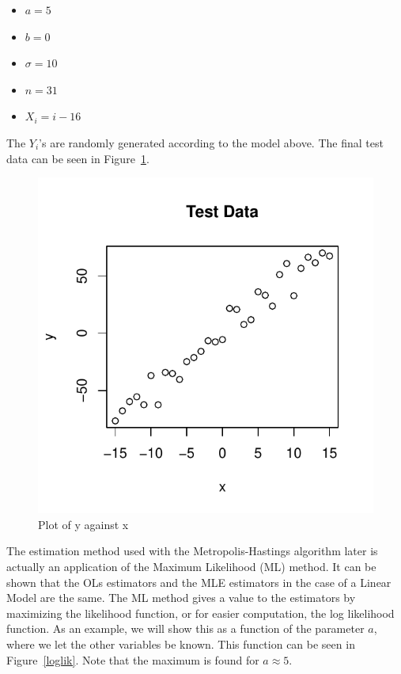 \documentclass[a4paper,10pt]{article}\usepackage[]{graphicx}\usepackage[]{color}
\makeatletter
\def\maxwidth{ %
  \ifdim\Gin@nat@width>\linewidth
    \linewidth
  \else
    \Gin@nat@width
  \fi
}
\newenvironment{knitrout}{}{} %
\makeatother
\begin{document}
\begin{itemize}
  \item $a = 5$
  \item $b = 0$
  \item $\sigma = 10$
  \item $n = 31$
  \item $X_i = i-16$
\end{itemize}
The $Y_i$'s are randomly generated according to the model above. The final test data can be seen in Figure~\ref{Data}.

\begin{figure}[H]
\begin{knitrout}
\color{fgcolor}

{\centering \includegraphics[width=\maxwidth]{figure/setup_parameters-1} 

}



\end{knitrout}
\caption{Plot of y against x}\label{Data}
\end{figure}

\noindent The estimation method used with the Metropolis-Hastings algorithm later is actually an application of the Maximum Likelihood (ML) method. It can be shown that the OLs estimators and the MLE estimators in the case of a Linear Model are the same. The ML method gives a value to the estimators by maximizing the likelihood function, or for easier computation, the log likelihood function. As an example, we will show this as a function of the parameter $a$, where we let the other variables be known. This function can be seen in Figure~\ref{loglik}. Note that the maximum is found for $a \approx 5$.
\end{document}
